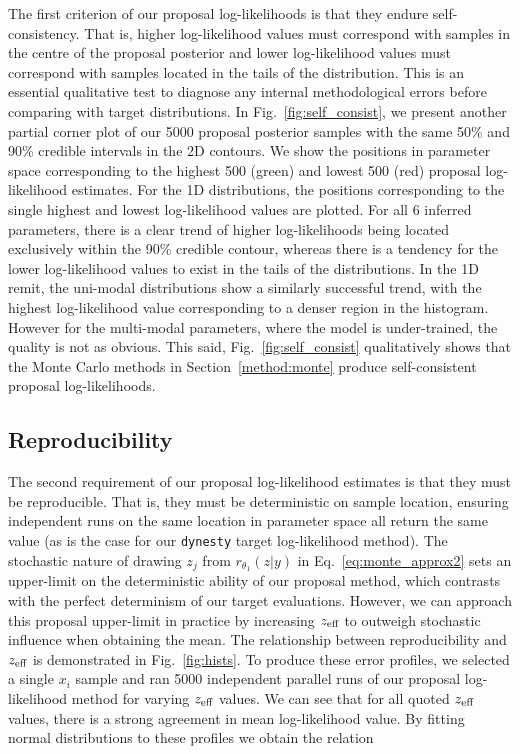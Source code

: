 \documentclass[a4paper]{jpconf}
\begin{document}
The first criterion of our proposal log-likelihoods is that they endure self-consistency. That is, higher log-likelihood values must correspond with samples in the centre of the proposal posterior and lower log-likelihood values must correspond with samples located in the tails of the distribution. This is an essential qualitative test to diagnose any internal methodological errors before comparing with target distributions. In Fig.~\ref{fig:self_consist}, we present another partial corner plot of our 5000 proposal posterior samples with the same 50\% and 90\% credible intervals in the 2D contours. We show the positions in parameter space corresponding to the highest 500 (green) and lowest 500 (red) proposal log-likelihood estimates. For the 1D distributions, the positions corresponding to the single highest and lowest log-likelihood values are plotted. For all 6 inferred parameters, there is a clear trend of higher log-likelihoods being located exclusively within the 90\% credible contour, whereas there is a tendency for the lower log-likelihood values to exist in the tails of the distributions. In the 1D remit, the uni-modal distributions show a similarly successful trend, with the highest log-likelihood value corresponding to a denser region in the histogram. However for the multi-modal parameters, where the model is under-trained, the quality is not as obvious. This said, Fig.~\ref{fig:self_consist} qualitatively shows that the Monte Carlo methods in Section~\ref{method:monte} produce self-consistent proposal log-likelihoods.

\subsection{Reproducibility}\label{results:repro} %

The second requirement of our proposal log-likelihood estimates is that they must be reproducible. That is, they must be deterministic on sample location, ensuring independent runs on the same location in parameter space all return the same value (as is the case for our \texttt{dynesty} target log-likelihood method). The stochastic nature of drawing $z_j$ from $r_{\theta_1}(z|y)$ in Eq.~\ref{eq:monte_approx2} sets an upper-limit on the deterministic ability of our proposal method, which contrasts with the perfect determinism of our target evaluations. However, we can approach this proposal upper-limit in practice by increasing $z_\textup{eff}$ to outweigh stochastic influence when obtaining the mean. The relationship between reproducibility and $z_\textup{eff}$ is demonstrated in Fig.~\ref{fig:hists}. To produce these error profiles, we selected a single $x_i$ sample and ran 5000 independent parallel runs of our proposal log-likelihood method for varying $z_\textup{eff}$ values. We can see that for all quoted $z_\textup{eff}$ values, there is a strong agreement in mean log-likelihood value. By fitting normal distributions to these profiles we obtain the relation
\end{document}
